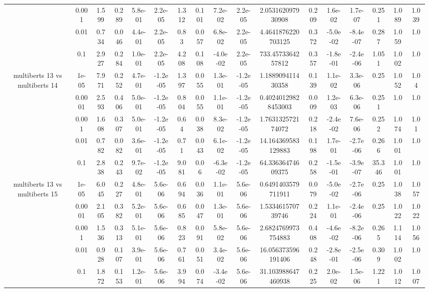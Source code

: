 \begin{tabular}{|c|c|c|c|c|c|c|c|c|c|c|c|c|c|c|c|c|}
 & 0.001 & 1.599 & 0.289 & 5.8e-01 & 2.2e-05 & 1.312 & 0.101 & 7.2e-02 & 2.2e-05 & 2.053162097930908 & 0.209 & 1.6e-02 & 1.7e-07 & 0.251 & 1.089 & 1.039 \\
 & 0.01 & 0.734 & 0.046 & 4.4e-01 & 2.2e-05 & 0.83 & 0.057 & 6.8e-02 & 2.2e-05 & 4.4641876220703125 & 0.372 & -5.0e-02 & -8.4e-07 & 0.287 & 1.059 & 1.0 \\
 & 0.1 & 2.927 & 0.284 & 1.0e-01 & 2.2e-05 & 4.208 & 0.108 & -4.0e-02 & 2.2e-05 & 733.4573364257812 & 0.357 & -1.8e-01 & -2.4e-06 & 1.051 & 1.002 & 1.0 \\
\hline
\multirow{5}{*}{multiberts 13 vs multiberts 14} & 1e-05 & 7.971 & 0.252 & 4.7e-01 & -1.2e-05 & 1.397 & 0.055 & 1.3e-01 & -1.2e-05 & 1.188909411430358 & 0.139 & 1.1e-02 & 3.3e-06 & 0.25 & 1.052 & 1.04 \\
 & 0.0001 & 2.593 & 0.406 & 5.0e-01 & -1.2e-05 & 0.804 & 0.055 & 1.1e-01 & -1.2e-05 & 0.40240129828453003 & 0.009 & 1.2e-03 & 6.3e-06 & 0.251 & 1.0 & 1.0 \\
 & 0.001 & 1.608 & 0.307 & 5.0e-01 & -1.2e-05 & 0.64 & 0.038 & 8.3e-02 & -1.2e-05 & 1.763132572174072 & 0.218 & -2.4e-02 & 7.6e-06 & 0.252 & 1.074 & 1.01 \\
 & 0.01 & 0.782 & 0.082 & 3.6e-01 & -1.2e-05 & 0.71 & 0.043 & 6.1e-02 & -1.2e-05 & 14.164369583129883 & 0.198 & 1.7e-01 & -2.7e-06 & 0.266 & 1.001 & 1.0 \\
 & 0.1 & 2.838 & 0.243 & 9.7e-02 & -1.2e-05 & 9.081 & 0.06 & -6.3e-02 & -1.2e-05 & 64.33636474609375 & 0.258 & -1.5e-01 & -3.9e-07 & 35.346 & 1.001 & 1.0 \\
\hline
\multirow{5}{*}{multiberts 13 vs multiberts 15} & 1e-05 & 6.045 & 0.227 & 4.8e-01 & 5.6e-06 & 0.694 & 0.036 & 1.1e-01 & 5.6e-06 & 0.6491403579711911 & 0.079 & -5.0e-02 & -2.7e-06 & 0.25 & 1.038 & 1.057 \\
 & 0.0001 & 2.105 & 0.382 & 5.2e-01 & 5.6e-06 & 0.685 & 0.047 & 1.3e-01 & 5.6e-06 & 1.533461570739746 & 0.224 & 1.1e-01 & -2.4e-06 & 0.25 & 1.022 & 1.022 \\
 & 0.001 & 1.536 & 0.313 & 5.1e-01 & 5.6e-06 & 0.823 & 0.091 & 5.8e-02 & 5.6e-06 & 2.6824769973754883 & 0.408 & -4.6e-02 & -8.2e-06 & 0.265 & 1.114 & 1.056 \\
 & 0.01 & 0.928 & 0.107 & 3.9e-01 & 5.6e-06 & 0.761 & 0.051 & 3.4e-02 & 5.6e-06 & 16.056373596191406 & 0.248 & -2.8e-01 & -2.5e-06 & 0.309 & 1.002 & 1.0 \\
 & 0.1 & 1.872 & 0.153 & 1.2e-01 & 5.6e-06 & 3.994 & 0.074 & -3.4e-02 & 5.6e-06 & 31.103988647460938 & 0.225 & 2.0e-02 & 1.5e-06 & 1.221 & 1.012 & 1.007 \\

\end{tabular}
